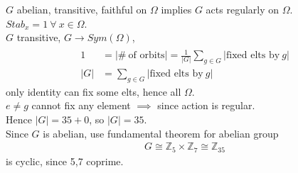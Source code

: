 \documentclass{article}
\begin{document}
\begin{homeworkProblem}
    $G$ abelian, transitive, faithful on $\Omega$ implies 
    $G$ acts regularly on $\Omega$.\\
    $Stab_x = 1 \ \forall \ x \in \Omega$.\\
    $G$ transitive, $G \xrightarrow[]{} Sym (\Omega)$,
    \begin{align}
        1 &= \lvert \# \ \text{of orbits} \rvert = \frac{ 1 }{ \lvert G \rvert } 
        \sum_{g \in G} \lvert \text{fixed elts by} \ g \rvert \\
        \lvert G \rvert &= \sum_{g \in G} \lvert \text{fixed elts by} \ g\rvert
    \end{align}
    only identity can fix some elts, hence all $\Omega$.\\
    $e \neq g$ cannot fix any element $\implies$ since action is regular.\\
    Hence $\lvert G \rvert = 35 + 0$, so $\lvert G \rvert = 35$.\\
    Since $G$ is abelian, use fundamental theorem for abelian group
    \begin{align}
        G \cong \mathbb{Z}_5 \times \mathbb{Z}_7 \cong \mathbb{Z}_{35}
    \end{align}
    is cyclic, since 5,7 coprime.\\
    


    
    
    

    
    


    
    


    
\end{homeworkProblem}

\pagebreak
\end{document}
